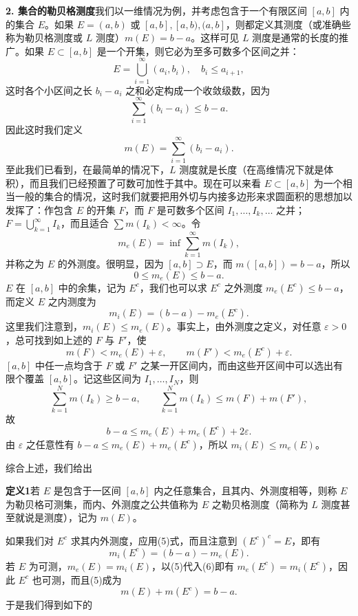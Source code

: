 \medskip
\noindent\textbf{2. 集合的勒贝格测度}\quad 我们以一维情况为例，并考虑包含于一个有限区间 $[a,b]$ 内的集合 $E$。如果 $E=(a,b)$ 或 $[a,b],[a,b),(a,b]$，则都定义其测度（或准确些称为勒贝格测度或 $L$ 测度）$m(E)=b-a$。这样可见 $L$ 测度是通常的长度的推广。如果 $E\subset[a,b]$ 是一个开集，则它必为至多可数多个区间之并：
\[
 E=\bigcup_{i=1}^{\infty}(a_i,b_i),\quad b_i\le a_{i+1},
\]
这时各个小区间之长 $b_i-a_i$ 之和必定构成一个收敛级数，因为
\[
 \sum_{i=1}^{\infty}(b_i-a_i)\le b-a.
\]
因此这时我们定义
\begin{equation}
 m(E)=\sum_{i=1}^{\infty}(b_i-a_i).
 \tag{3}
\end{equation}
至此我们已看到，在最简单的情况下，$L$ 测度就是长度（在高维情况下就是体积），而且我们已经预置了可数可加性于其中。现在可以来看 $E\subset[a,b]$ 为一个相当一般的集合的情况，这时我们就要把用外切与内接多边形来求圆面积的思想加以发挥了：作包含 $E$ 的开集 $F$，而 $F$ 是可数多个区间 $I_1,\ldots,I_k,\ldots$ 之并；$F=\bigcup_{k=1}^{\infty}I_k$，而且适合 $\sum m(I_k)<\infty$。令
\[
 m_e(E)=\inf\sum_{k=1}^{\infty}m(I_k),
\]
并称之为 $E$ 的外测度。很明显，因为 $[a,b]\supset E$，而 $m([a,b])=b-a$，所以
\begin{equation}
 0\le m_e(E)\le b-a.
 \tag{4}
\end{equation}
$E$ 在 $[a,b]$ 中的余集，记为 $E^c$，我们也可以求 $E^c$ 之外测度 $m_e(E^c)\le b-a$，而定义 $E$ 之内测度为
\begin{equation}
 m_i(E)=(b-a)-m_e(E^c).
 \tag{5}
\end{equation}
这里我们注意到，$m_i(E)\le m_e(E)$。事实上，由外测度之定义，对任意 $\varepsilon>0$，总可找到如上述的 $F$ 与 $F'$，使
\[
 m(F)<m_e(E)+\varepsilon,\qquad m(F')<m_e(E^c)+\varepsilon.
\]
$[a,b]$ 中任一点均含于 $F$ 或 $F'$ 之某一开区间内，而由这些开区间中可以选出有限个覆盖 $[a,b]$。记这些区间为 $I_1,\ldots,I_N$，则
\[
 \sum_{k=1}^{N}m(I_k)\ge b-a,\qquad \sum_{k=1}^{N}m(I_k)\le m(F)+m(F'),
\]
故
\[
 b-a\le m_e(E)+m_e(E^c)+2\varepsilon.
\]
由 $\varepsilon$ 之任意性有 $b-a\le m_e(E)+m_e(E^c)$，所以 $m_i(E)\le m_e(E)$。

综合上述，我们给出

\noindent\textbf{定义1}\quad 若 $E$ 是包含于一区间 $[a,b]$ 内之任意集合，且其内、外测度相等，则称 $E$ 为勒贝格可测集，而内、外测度之公共值称为 $E$ 之勒贝格测度（简称为 $L$ 测度甚至就说是测度），记为 $m(E)$。

如果我们对 $E^c$ 求其内外测度，应用(5)式，而且注意到 $(E^c)^c=E$，即有
\begin{equation}
 m_i(E^c)=(b-a)-m_e(E).
 \tag{6}
\end{equation}
若 $E$ 为可测，$m_e(E)=m_i(E)$，以(5)代入(6)即有 $m_e(E^c)=m_i(E^c)$，因此 $E^c$ 也可测，而且(5)成为
\begin{equation}
 m(E)+m(E^c)=b-a.
 \tag{7}
\end{equation}
于是我们得到如下的

